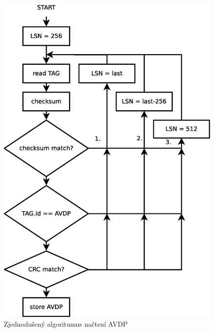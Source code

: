 \begin{figure}[ht] 
    \centering
    \includegraphics[scale=0.4]{obrazky/avdp.eps}
    \caption{Zjednodušený algoritumus načtení AVDP}
    \label{fig:avdp}
\end{figure}

